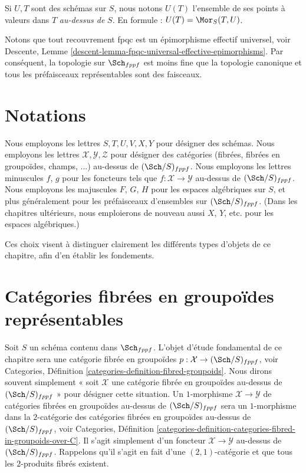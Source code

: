 \medskip\noindent
Si $U, T$ sont des schémas sur $S$, nous notons
$U(T)$ l'ensemble de ses points à valeurs dans $T$ {\it au-dessus de} $S$.
En formule : $U(T) = \Mor_S(T, U)$.

\medskip\noindent
Notons que tout recouvrement fpqc est un épimorphisme effectif
universel, voir
Descente, Lemme \ref{descent-lemma-fpqc-universal-effective-epimorphisms}.
Par conséquent, la topologie sur $\Sch_{fppf}$
est moins fine que la topologie canonique et tous les préfaisceaux représentables
sont des faisceaux.








\section{Notations}
\label{section-notation}

\noindent
Nous employons les lettres $S, T, U, V, X, Y$ pour désigner des schémas.
Nous employons les lettres $\mathcal{X}, \mathcal{Y}, \mathcal{Z}$ pour désigner des
catégories (fibrées, fibrées en groupoïdes, champs, ...)
au-dessus de $(\Sch/S)_{fppf}$. Nous employons les lettres minuscules
$f$, $g$ pour les foncteurs tels que $f : \mathcal{X} \to \mathcal{Y}$
au-dessus de $(\Sch/S)_{fppf}$.
Nous employons les majuscules $F$, $G$, $H$ pour les espaces algébriques sur $S$, et plus
généralement pour les préfaisceaux d'ensembles sur $(\Sch/S)_{fppf}$.
(Dans les chapitres ultérieurs, nous emploierons de nouveau aussi $X$, $Y$, etc.
pour les espaces algébriques.)

\medskip\noindent
Ces choix visent à distinguer clairement les différents
types d'objets de ce chapitre, afin d'en établir les fondements.









\section{Catégories fibrées en groupoïdes représentables}
\label{section-representable}

\noindent
Soit $S$ un schéma contenu dans $\Sch_{fppf}$.
L'objet d'étude fondamental de ce chapitre sera une
catégorie fibrée en groupoïdes
$p : \mathcal{X} \to (\Sch/S)_{fppf}$, voir
Categories, Définition \ref{categories-definition-fibred-groupoids}.
Nous dirons souvent simplement « soit $\mathcal{X}$ une catégorie fibrée
en groupoïdes au-dessus de $(\Sch/S)_{fppf}$ » pour désigner
cette situation. Un $1$-morphisme $\mathcal{X} \to \mathcal{Y}$ de catégories
fibrées en groupoïdes au-dessus de $(\Sch/S)_{fppf}$ sera un $1$-morphisme
dans la $2$-catégorie des catégories fibrées en groupoïdes au-dessus de
$(\Sch/S)_{fppf}$, voir
Categories,
Définition \ref{categories-definition-categories-fibred-in-groupoids-over-C}.
Il s'agit simplement d'un foncteur $\mathcal{X} \to \mathcal{Y}$ au-dessus de
$(\Sch/S)_{fppf}$.
Rappelons qu'il s'agit en fait d'une $(2, 1)$-catégorie et que tous les $2$-produits fibrés
existent.

